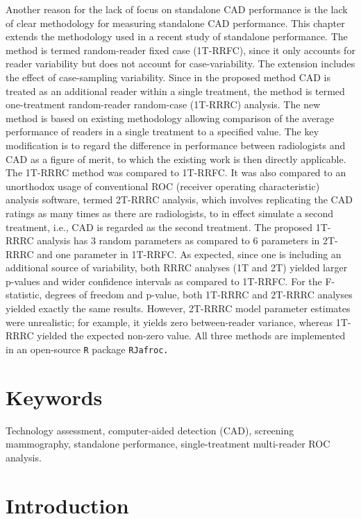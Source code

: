 \documentclass[
]{book}
\begin{document}
Another reason for the lack of focus on standalone CAD performance is the lack of clear methodology for measuring standalone CAD performance. This chapter extends the methodology used in a recent study of standalone performance. The method is termed random-reader fixed case (1T-RRFC), since it only accounts for reader variability but does not account for case-variability. The extension includes the effect of case-sampling variability. Since in the proposed method CAD is treated as an additional reader within a single treatment, the method is termed one-treatment random-reader random-case (1T-RRRC) analysis. The new method is based on existing methodology allowing comparison of the average performance of readers in a single treatment to a specified value. The key modification is to regard the difference in performance between radiologists and CAD as a figure of merit, to which the existing work is then directly applicable. The 1T-RRRC method was compared to 1T-RRFC. It was also compared to an unorthodox usage of conventional ROC (receiver operating characteristic) analysis software, termed 2T-RRRC analysis, which involves replicating the CAD ratings as many times as there are radiologists, to in effect simulate a second treatment, i.e., CAD is regarded as the second treatment. The proposed 1T-RRRC analysis has 3 random parameters as compared to 6 parameters in 2T-RRRC and one parameter in 1T-RRFC. As expected, since one is including an additional source of variability, both RRRC analyses (1T and 2T) yielded larger p-values and wider confidence intervals as compared to 1T-RRFC. For the F-statistic, degrees of freedom and p-value, both 1T-RRRC and 2T-RRRC analyses yielded exactly the same results. However, 2T-RRRC model parameter estimates were unrealistic; for example, it yields zero between-reader variance, whereas 1T-RRRC yielded the expected non-zero value. All three methods are implemented in an open-source \texttt{R} package \texttt{RJafroc.}

\hypertarget{standalone-cad-radiologists-ker-words}{%
\section{Keywords}\label{standalone-cad-radiologists-ker-words}}

Technology assessment, computer-aided detection (CAD), screening mammography, standalone performance, single-treatment multi-reader ROC analysis.

\hypertarget{standalone-cad-radiologists-introduction}{%
\section{Introduction}\label{standalone-cad-radiologists-introduction}}
\end{document}
